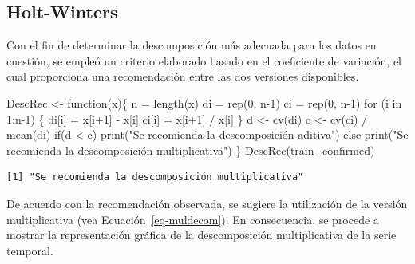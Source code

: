 \documentclass[
  us-letterpaper,
]{scrreprt}
\newenvironment{Shaded}{\begin{snugshade}}{\end{snugshade}}
\newcommand{\ControlFlowTok}[1]{\textcolor[rgb]{0.00,0.23,0.31}{#1}}
\newcommand{\DecValTok}[1]{\textcolor[rgb]{0.68,0.00,0.00}{#1}}
\newcommand{\FunctionTok}[1]{\textcolor[rgb]{0.28,0.35,0.67}{#1}}
\newcommand{\NormalTok}[1]{\textcolor[rgb]{0.00,0.23,0.31}{#1}}
\newcommand{\OtherTok}[1]{\textcolor[rgb]{0.00,0.23,0.31}{#1}}
\newcommand{\SpecialCharTok}[1]{\textcolor[rgb]{0.37,0.37,0.37}{#1}}
\newcommand{\StringTok}[1]{\textcolor[rgb]{0.13,0.47,0.30}{#1}}
\theoremstyle{definition}
\theoremstyle{plain}
\theoremstyle{plain}
\theoremstyle{definition}
\theoremstyle{remark}
\begin{document}
\subsection{Holt-Winters}\label{sec-holt-winters}

Con el fin de determinar la descomposición más adecuada para los datos
en cuestión, se empleó un criterio elaborado basado en el coeficiente de
variación, el cual proporciona una recomendación entre las dos versiones
disponibles.

\begin{Shaded}
\begin{Highlighting}[]
\NormalTok{DescRec }\OtherTok{\textless{}{-}} \ControlFlowTok{function}\NormalTok{(x)\{}
\NormalTok{  n }\OtherTok{=} \FunctionTok{length}\NormalTok{(x)}
\NormalTok{  di }\OtherTok{=} \FunctionTok{rep}\NormalTok{(}\DecValTok{0}\NormalTok{, n}\DecValTok{{-}1}\NormalTok{)}
\NormalTok{  ci }\OtherTok{=} \FunctionTok{rep}\NormalTok{(}\DecValTok{0}\NormalTok{, n}\DecValTok{{-}1}\NormalTok{)}
  \ControlFlowTok{for}\NormalTok{ (i }\ControlFlowTok{in} \DecValTok{1}\SpecialCharTok{:}\NormalTok{n}\DecValTok{{-}1}\NormalTok{) \{}
\NormalTok{    di[i] }\OtherTok{=}\NormalTok{ x[i}\SpecialCharTok{+}\DecValTok{1}\NormalTok{] }\SpecialCharTok{{-}}\NormalTok{ x[i]}
\NormalTok{    ci[i] }\OtherTok{=}\NormalTok{ x[i}\SpecialCharTok{+}\DecValTok{1}\NormalTok{] }\SpecialCharTok{/}\NormalTok{ x[i]}
\NormalTok{  \}}
\NormalTok{  d }\OtherTok{\textless{}{-}} \FunctionTok{cv}\NormalTok{(di) }
\NormalTok{  c }\OtherTok{\textless{}{-}} \FunctionTok{cv}\NormalTok{(ci) }\SpecialCharTok{/} \FunctionTok{mean}\NormalTok{(di)}
  \ControlFlowTok{if}\NormalTok{(d }\SpecialCharTok{\textless{}}\NormalTok{ c)}
    \FunctionTok{print}\NormalTok{(}\StringTok{"Se recomienda la descomposición aditiva"}\NormalTok{)}
  \ControlFlowTok{else}
    \FunctionTok{print}\NormalTok{(}\StringTok{"Se recomienda la descomposición multiplicativa"}\NormalTok{)}
\NormalTok{\}}
\FunctionTok{DescRec}\NormalTok{(train\_confirmed)}
\end{Highlighting}
\end{Shaded}

\begin{verbatim}
[1] "Se recomienda la descomposición multiplicativa"
\end{verbatim}

De acuerdo con la recomendación observada, se sugiere la utilización de
la versión multiplicativa (vea Ecuación~\ref{eq-muldecom}). En
consecuencia, se procede a mostrar la representación gráfica de la
descomposición multiplicativa de la serie temporal.
\end{document}

